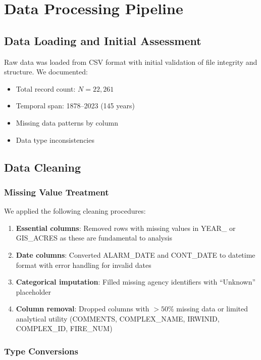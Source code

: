 \documentclass[12pt,a4paper]{article}
\begin{document}
\section{Data Processing Pipeline}

\subsection{Data Loading and Initial Assessment}

Raw data was loaded from CSV format with initial validation of file integrity and structure. We documented:
\begin{itemize}
    \item Total record count: $N = 22{,}261$
    \item Temporal span: 1878--2023 (145 years)
    \item Missing data patterns by column
    \item Data type inconsistencies
\end{itemize}

\subsection{Data Cleaning}

\subsubsection{Missing Value Treatment}

We applied the following cleaning procedures:

\begin{enumerate}
    \item \textbf{Essential columns}: Removed rows with missing values in YEAR\_ or GIS\_ACRES as these are fundamental to analysis
    \item \textbf{Date columns}: Converted ALARM\_DATE and CONT\_DATE to datetime format with error handling for invalid dates
    \item \textbf{Categorical imputation}: Filled missing agency identifiers with ``Unknown'' placeholder
    \item \textbf{Column removal}: Dropped columns with $>50\%$ missing data or limited analytical utility (COMMENTS, COMPLEX\_NAME, IRWINID, COMPLEX\_ID, FIRE\_NUM)
\end{enumerate}

\subsubsection{Type Conversions}
\end{document}

